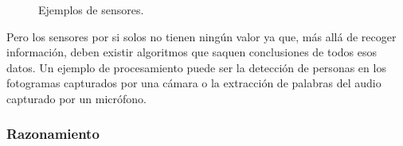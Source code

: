 \begin{figure}[h!]
  \begin{center}
    \subcapcentertrue
  \end{center}
\caption{Ejemplos de sensores.}
\label{fig:ejemplos_sensores}
\end{figure}

Pero los sensores por si solos no tienen ningún valor ya que, más allá de recoger información, deben existir algoritmos que saquen conclusiones de todos esos datos. Un ejemplo de procesamiento puede ser la detección de personas en los fotogramas capturados por una cámara o la extracción de palabras del audio capturado por un micrófono.

\subsubsection{Razonamiento} 
\label{sec:razonamiento}

